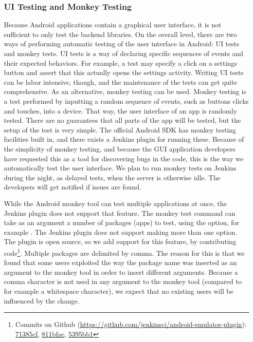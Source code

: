 \subsubsection{UI Testing and Monkey Testing}
Because Android applications contain a graphical user interface, it is not sufficient to only test the backend libraries. On the overall level, there are two ways of performing automatic testing of the user interface in Android: UI tests and monkey tests. UI tests is a way of declaring specific sequences of events and their expected behaviors. For example, a test may specify a click on a settings button and assert that this actually opens the settings activity. Writing UI tests can be labor intensive, though, and the maintenance of the tests can get quite comprehensive. As an alternative, monkey testing can be used. Monkey testing is a test performed by inputting a random sequence of events, such as buttons clicks and touches, into a device. That way, the user interface of an app is randomly tested. There are no guarantees that all parts of the app will be tested, but the setup of the test is very simple. The official Android SDK has monkey testing facilities built in, and there exists a Jenkins plugin for running these. Because of the simplicity of monkey testing, and because the GUI application developers have requested this as a tool for discovering bugs in the code, this is the way we automatically test the user interface. We plan to run monkey tests on Jenkins during the night, as delayed tests, when the server is otherwise idle. The developers will get notified if issues are found.

While the Android monkey tool can test multiple applications at once, the Jenkins plugin does not support that feature. The monkey test command can take as an argument a number of packages (apps) to test, using the  option, for example . The Jenkins plugin does not support making more than one  option. The plugin is open source, so we add support for this feature, by contributing code\footnote{Commits on Github (\url{https://github.com/jenkinsci/android-emulator-plugin}): \href{https://github.com/jenkinsci/android-emulator-plugin/commit/71385cfb3e3bb4dfa6d11170c52ee69808a4f72f}{71385cf},  \href{https://github.com/jenkinsci/android-emulator-plugin/commit/811bfac657565b25ce2f7fc9d6399d9f22bb6042}{811bfac}, \href{https://github.com/jenkinsci/android-emulator-plugin/commit/5395bb1fd23032cab48a7bfff61a26544f078785}{5395bb1}}. Multiple packages are delimited by comma. The reason for this is that we found that some users exploited the way the package name was inserted as an argument to the monkey tool in order to insert different arguments. Because a comma character is not used in any argument to the monkey tool (compared to for example a whitespace character), we expect that no existing users will be influenced by the change.

